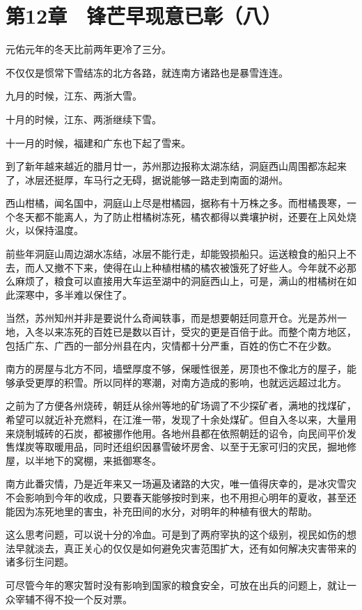 \section{第12章　锋芒早现意已彰（八）}

元佑元年的冬天比前两年更冷了三分。

不仅仅是惯常下雪结冻的北方各路，就连南方诸路也是暴雪连连。

九月的时候，江东、两浙大雪。

十月的时候，江东、两浙继续下雪。

十一月的时候，福建和广东也下起了雪来。

到了新年越来越近的腊月廿一，苏州那边报称太湖冻结，洞庭西山周围都冻起来了，冰层还挺厚，车马行之无碍，据说能够一路走到南面的湖州。

西山柑橘，闻名国中，洞庭山上尽是柑橘园，据称有十万株之多。而柑橘畏寒，一个冬天都不能离人，为了防止柑橘树冻死，橘农都得以粪壤护树，还要在上风处烧火，以保持温度。

前些年洞庭山周边湖水冻结，冰层不能行走，却能毁损船只。运送粮食的船只上不去，而人又撤不下来，使得在山上种植柑橘的橘农被饿死了好些人。今年就不必那么麻烦了，粮食可以直接用大车运至湖中的洞庭西山上，可是，满山的柑橘树在如此深寒中，多半难以保住了。

当然，苏州知州并非是要说什么奇闻轶事，而是想要朝廷同意开仓。光是苏州一地，入冬以来冻死的百姓已是数以百计，受灾的更是百倍于此。而整个南方地区，包括广东、广西的一部分州县在内，灾情都十分严重，百姓的伤亡不在少数。

南方的房屋与北方不同，墙壁厚度不够，保暖性很差，房顶也不像北方的屋子，能够承受更厚的积雪。所以同样的寒潮，对南方造成的影响，也就远远超过北方。

之前为了方便各州烧砖，朝廷从徐州等地的矿场调了不少探矿者，满地的找煤矿，希望可以就近补充燃料，在江淮一带，发现了十余处煤矿。但自入冬以来，大量用来烧制城砖的石炭，都被挪作他用。各地州县都在依照朝廷的诏令，向民间平价发售煤炭等取暖用品，同时还组织因暴雪破坏房舍、以至于无家可归的灾民，掘地修屋，以半地下的窝棚，来抵御寒冬。

南方此番灾情，乃是近年来又一场遍及诸路的大灾，唯一值得庆幸的，是冰灾雪灾不会影响到今年的收成，只要春天能够按时到来，也不用担心明年的夏收，甚至还能因为冻死地里的害虫，补充田间的水分，对明年的种植有很大的帮助。

这么思考问题，可以说十分的冷血。可是到了两府宰执的这个级别，视民如伤的想法早就淡去，真正关心的仅仅是如何避免灾害范围扩大，还有如何解决灾害带来的诸多衍生问题。

可尽管今年的寒灾暂时没有影响到国家的粮食安全，可放在出兵的问题上，就让一众宰辅不得不投一个反对票。

